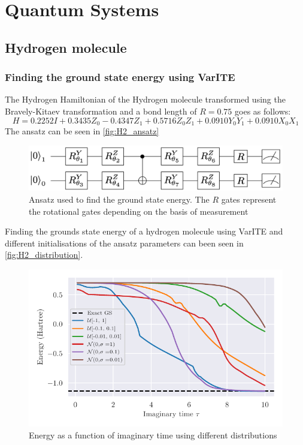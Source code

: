 \documentclass[../main.tex]{subfiles}
\begin{document}
\chapter{Quantum Systems}
\label{sec:sevenfive}


\section{Hydrogen molecule}
\subsection{Finding the ground state energy using VarITE}
The Hydrogen Hamiltonian of the Hydrogen molecule transformed using the Bravely-Kitaev transformation and a bond length of $R=0.75$ \cite{McArdle_2019} goes as follows:
\begin{equation*}
H=0.2252 I+0.3435 Z_{0}-0.4347 Z_{1}+0.5716 Z_{0} Z_{1}+0.0910 Y_{0} Y_{1}+0.0910 X_{0} X_{1}
\end{equation*}
The ansatz can be seen in \autoref{fig:H2_ansatz}
\begin{figure}[h]
    \begin{center}
        \includegraphics[scale=0.45]{figures/ansatz_varite.png}
        \caption{Ansatz used to find the ground state energy. The $R$ gates represent the rotational gates depending on the basis of measurement}
        \label{fig:H2_ansatz}
    \end{center}
\end{figure}

Finding the  grounds state energy of a hydrogen molecule using VarITE and different initialisations of the ansatz parameters can been seen in \autoref{fig:H2_distribution}.

\begin{figure}
    \begin{center}
        \includegraphics{figures/energy_H2_search_01step.pdf}
        \caption{Energy as a function of imaginary time using different distributions}
        \label{fig:H2_distribution}
    \end{center}
\end{figure}
\end{document}
